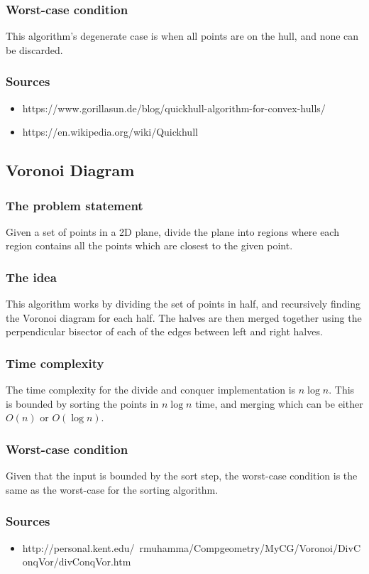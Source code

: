 \documentclass{article}
\begin{document}
        \subsubsection{Worst-case condition}
            This algorithm's degenerate case is when all points are on the hull, and none can be discarded.
        \subsubsection{Sources}
            \begin{itemize}
                \item https://www.gorillasun.de/blog/quickhull-algorithm-for-convex-hulls/
                \item https://en.wikipedia.org/wiki/Quickhull
            \end{itemize}
    \subsection{Voronoi Diagram}
        \subsubsection{The problem statement}
            Given a set of points in a 2D plane, divide the plane into regions where each region contains all the points which are closest to the given point.
        \subsubsection{The idea}
            This algorithm works by dividing the set of points in half, and recursively finding the Voronoi diagram for each half.
            The halves are then merged together using the perpendicular bisector of each of the edges between left and right halves.
        \subsubsection{Time complexity}
            The time complexity for the divide and conquer implementation is \(n \log n\).
            This is bounded by sorting the points in \(n \log n\) time, and merging which can be either \(O(n)\) or \(O(\log n)\).
        \subsubsection{Worst-case condition}
            Given that the input is bounded by the sort step, the worst-case condition is the same as the worst-case for the sorting algorithm.
        \subsubsection{Sources}
            \begin{itemize}
                \item http://personal.kent.edu/~rmuhamma/Compgeometry/MyCG/Voronoi/DivConqVor/divConqVor.htm
            \end{itemize}
\end{document}
